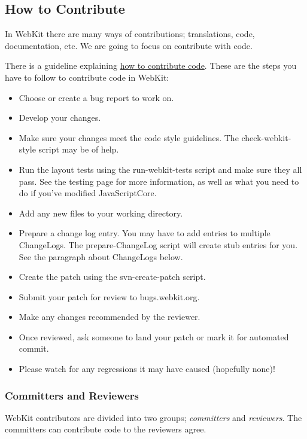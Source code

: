 \subsection{How to Contribute}

\par In WebKit there are many ways of contributions; translations, code, documentation, etc. We are going to focus on contribute with code.
\par There is a guideline explaining \href{http://www.webkit.org/coding/contributing.html}{how to contribute code}. These are the steps you have to follow to contribute code in WebKit:
\begin{itemize}
	\item Choose or create a bug report to work on.
	\item Develop your changes.
	\item Make sure your changes meet the code style guidelines. The check-webkit-style script may be of help.
	\item Run the layout tests using the run-webkit-tests script and make sure they all pass. See the testing page for more information, as well as what you need to do if you've modified JavaScriptCore.
	\item Add any new files to your working directory.
	\item Prepare a change log entry. You may have to add entries to multiple ChangeLogs. The prepare-ChangeLog script will create stub entries for you. See the paragraph about ChangeLogs below.
	\item Create the patch using the svn-create-patch script.
	\item Submit your patch for review to bugs.webkit.org.
	\item Make any changes recommended by the reviewer.
	\item Once reviewed, ask someone to land your patch or mark it for automated commit.
	\item Please watch for any regressions it may have caused (hopefully none)!
\end{itemize}

\subsubsection{Committers and Reviewers}

\par WebKit contributors are divided into two groups; \textit{committers} and \textit{reviewers}. The committers can contribute code to the reviewers agree.

